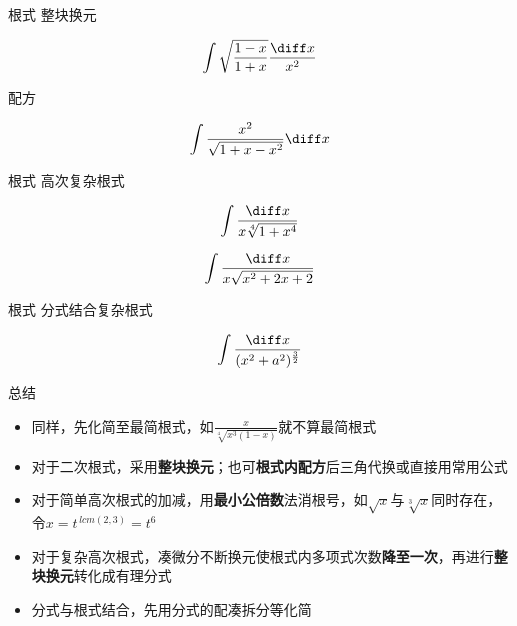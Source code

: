\documentclass{myslide}
\begin{document}
\begin{frame}{根式}
整块换元
\begin{example}
\[\int\sqrt{\frac{1-x}{1+x}}\frac{\diff x}{x^2}\]
\end{example}
配方
\begin{exercise}
\[\int \frac{x^2}{\sqrt{1+x-x^2}}\diff x\]
\end{exercise}
\end{frame}

\begin{frame}{根式}
高次复杂根式
\begin{example}[\textsection 6.2/7(9)]
\[\int \frac{\diff x}{x\sqrt[4]{1+x^4}}\]
\end{example}
\begin{exercise}[\textsection 6.2/7(3)]
\[\int \frac{\diff x}{x\sqrt{x^2+2x+2}}\]
\end{exercise}
\end{frame}

\begin{frame}{根式}
分式结合复杂根式
\begin{example}
\[\int \frac{\diff x}{(x^2+a^2)^{\frac{3}{2}}}\]
\end{example}
\end{frame}

\begin{frame}{总结}
\begin{itemize}
	\item 同样，先化简至最简根式，如$\displaystyle\frac{x}{\sqrt[4]{x^3(1-x)}}$就不算最简根式
	\item 对于二次根式，采用\textbf{整块换元}；也可\textbf{根式内配方}后三角代换或直接用常用公式
	\item 对于简单高次根式的加减，用\textbf{最小公倍数}法消根号，如$\sqrt{x}$与$\sqrt[3]{x}$同时存在，令$x=t^{\,lcm(2,3)}=t^6$
	\item 对于复杂高次根式，凑微分不断换元使根式内多项式次数\textbf{降至一次}，再进行\textbf{整块换元}转化成有理分式
	\item 分式与根式结合，先用分式的配凑拆分等化简
\end{itemize}
\end{frame}
\end{document}
